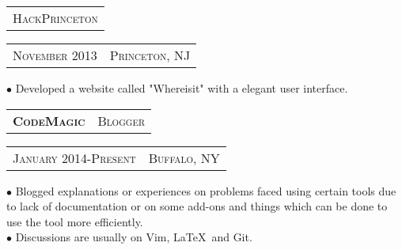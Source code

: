 \documentclass[10pt,a4paper,oneside]{article}
\begin{document}
    \vspace{-12pt}
    \begin{tabular}{c}
        {\small H\textsc{ack}P\textsc{rinceton}}
    \end{tabular}
    \hspace{4.7in}
    \textcolor{light-gray}{
        \begin{tabular}{c|c}
            {\small N\textsc{ovember 2013}}
            &{\small P\textsc{rinceton}, NJ}
        \end{tabular}
    }
    \vspace{-12pt}
    \begin{adjustwidth}{7pt}{0pt}
            {\footnotesize $\bullet$ Developed a website called "Whereisit" with a elegant user interface.}\\
    \end{adjustwidth}
    \vspace{-8pt}
    \begin{tabular}{c|c}
        \textbf{\normalsize C\textsc{ode}M\textsc{agic}}
        &\textmd{\normalsize B\textsc{logger}}
    \end{tabular}
    \hspace{3.83in}
    \textcolor{light-gray}{
        \begin{tabular}{c|c}
            {\small J\textsc{anuary 2014}-P\textsc{resent}}
            &{\small B\textsc{uffalo}, NY}
        \end{tabular}
    } 
    \vspace{-4mm}
    \begin{adjustwidth}{7pt}{0pt}
  {\footnotesize $\bullet$ Blogged explanations or experiences on problems faced using certain tools due to lack
            of documentation or on some add-ons and things which can be done to use the tool more efficiently.}\\
            {\footnotesize $\bullet$ Discussions are usually on Vim, \LaTeX \  and Git. }
    \end{adjustwidth}
    \vspace{10pt}
    \begin{comment}
        \begin{tabular}{c}
        \textbf{\normalsize A\textsc{ffiliations}}\\
        \end{tabular}
        \begin{adjustwidth}{7pt}{0pt}
            {\footnotesize \textbf{International Society of Technical Education(09-12)} -Participated in several events and
            organised a few events.}\\
            {\footnotesize \textbf{Computer Society of India(09-12)} -Member since 2009,organised few workshops and
        tutorial sessions.}
            \vspace{0pt}\\
        \end{adjustwidth} 
    \end{comment}
\end{document}
